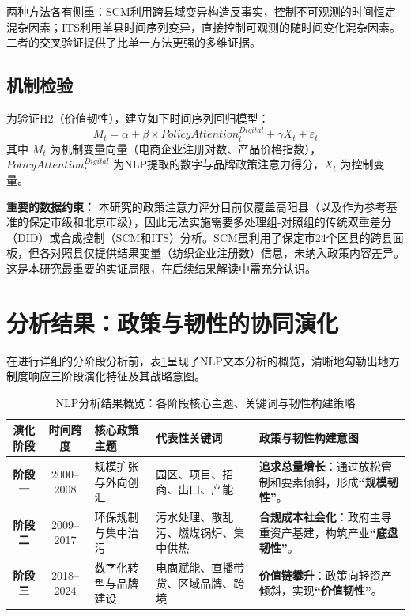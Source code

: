 \documentclass[12pt,a4paper]{ctexart}
\begin{document}
两种方法各有侧重：SCM利用跨县域变异构造反事实，控制不可观测的时间恒定混杂因素；ITS利用单县时间序列变异，直接控制可观测的随时间变化混杂因素。二者的交叉验证提供了比单一方法更强的多维证据。

\subsection{机制检验}
为验证H2（价值韧性），建立如下时间序列回归模型：
\begin{equation}
    M_t = \alpha + \beta \times PolicyAttention^{Digital}_t + \gamma X_t + \varepsilon_t
\end{equation}
其中 $M_t$ 为机制变量向量（电商企业注册对数、产品价格指数），$PolicyAttention^{Digital}_t$ 为NLP提取的数字与品牌政策注意力得分，$X_t$ 为控制变量。

\textbf{重要的数据约束：} 本研究的政策注意力评分目前仅覆盖高阳县（以及作为参考基准的保定市级和北京市级），因此无法实施需要多处理组-对照组的传统双重差分（DID）或合成控制（SCM和ITS）分析。SCM虽利用了保定市24个区县的跨县面板，但各对照县仅提供结果变量（纺织企业注册数）信息，未纳入政策内容差异。这是本研究最重要的实证局限，在后续结果解读中需充分认识。

\section{分析结果：政策与韧性的协同演化}
\label{sec:results}

在进行详细的分阶段分析前，表\ref{tab:nlp_overview}呈现了NLP文本分析的概览，清晰地勾勒出地方制度响应三阶段演化特征及其战略意图。

\begin{table}[htbp]
\centering
\caption{NLP分析结果概览：各阶段核心主题、关键词与韧性构建策略}
\label{tab:nlp_overview}
\begin{tabularx}{\textwidth}{c c X X X}
\toprule
\textbf{演化阶段} & \textbf{时间跨度} & \textbf{核心政策主题} & \textbf{代表性关键词} & \textbf{政策与韧性构建意图} \\
\midrule
\textbf{阶段一} & 2000--2008 & 规模扩张与外向创汇 & 园区、项目、招商、出口、产能 & \textbf{追求总量增长}：通过放松管制和要素倾斜，形成\textbf{\textquotedblleft 规模韧性\textquotedblright}。\\
\midrule
\textbf{阶段二} & 2009--2017 & 环保规制与集中治污 & 污水处理、散乱污、燃煤锅炉、集中供热 & \textbf{合规成本社会化}：政府主导重资产基建，构筑产业\textbf{\textquotedblleft 底盘韧性\textquotedblright}。\\
\midrule
\textbf{阶段三} & 2018--2024 & 数字化转型与品牌建设 & 电商赋能、直播带货、区域品牌、跨境 & \textbf{价值链攀升}：政策向轻资产倾斜，实现\textbf{\textquotedblleft 价值韧性\textquotedblright}。\\
\bottomrule
\end{tabularx}
\end{table}
\end{document}
